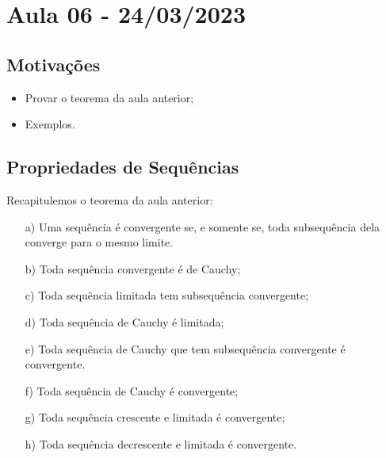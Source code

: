 \documentclass[analysis_notes.tex]{subfiles}
\begin{document}
\section{Aula 06 - 24/03/2023}
\subsection{Motiva\c c\~oes}
\begin{itemize}
	\item Provar o teorema da aula anterior;
	\item Exemplos.
\end{itemize}
\subsection{Propriedades de Sequências}
Recapitulemos o teorema da aula anterior:
\begin{theorem*}
	\begin{itemize}
		\item[a)]Uma sequência é convergente se, e somente se, toda subsequ\^encia dela converge para o mesmo limite.
		\item[b)] Toda sequência convergente é de Cauchy;
		\item[c)] Toda sequência limitada tem subsequ\^encia convergente;
		\item[d)] Toda sequência de Cauchy é limitada;
		\item[e)] Toda sequência de Cauchy que tem subsequ\^encia convergente é convergente.
		\item[f)] Toda sequência de Cauchy é convergente;
		\item[g)] Toda sequência crescente e limitada é convergente;
		\item[h)] Toda sequência decrescente e limitada é convergente.
	\end{itemize}
\end{theorem*}
\end{document}

